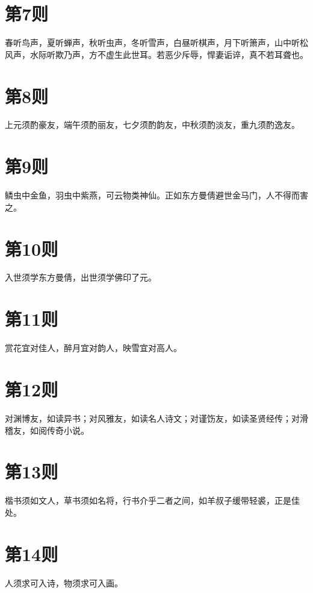 \documentclass[12pt,a4paper]{ctexbook}
\begin{document}
\section{第7则}
春听鸟声，夏听蝉声，秋听虫声，冬听雪声，白昼听棋声，月下听箫声，山中听松风声，水际听欺乃声，方不虚生此世耳。若恶少斥辱，悍妻诟谇，真不若耳聋也。\par

\section{第8则}
上元须酌豪友，端午须酌丽友，七夕须酌韵友，中秋须酌淡友，重九须酌逸友。\par

\section{第9则}
鳞虫中金鱼，羽虫中紫燕，可云物类神仙。正如东方曼倩避世金马门，人不得而害之。\par

\section{第10则}
入世须学东方曼倩，出世须学佛印了元。\par

\section{第11则}
赏花宜对佳人，醉月宜对韵人，映雪宜对高人。\par

\section{第12则}
对渊博友，如读异书；对风雅友，如读名人诗文；对谨饬友，如读圣贤经传；对滑稽友，如阅传奇小说。\par

\section{第13则}
楷书须如文人，草书须如名将，行书介乎二者之间，如羊叔子缓带轻裘，正是佳处。\par

\section{第14则}
人须求可入诗，物须求可入画。\par
\end{document}
